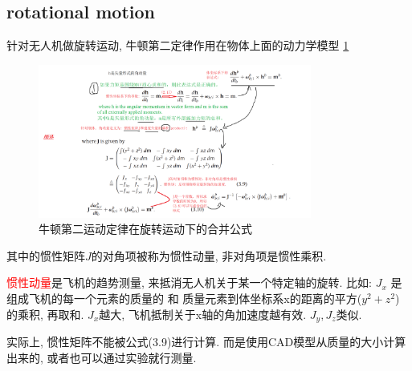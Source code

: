\documentclass[UTF8,a4paper,10pt,nocolorlinks]{ctexart}
\begin{document}
\subsection{rotational motion}
针对无人机做旋转运动, 牛顿第二定律作用在物体上面的动力学模型 \ref{equ_5}
\begin{figure}[htpb]
  \centering
  \includegraphics[width=0.8\textwidth]{picture/equ_5.png}
  \caption{牛顿第二运动定律在旋转运动下的合并公式}
  \label{equ_5}
\end{figure}
其中的惯性矩阵\textbf{$J$}的对角项被称为惯性动量, 非对角项是惯性乘积. \par
\textcolor{red}{惯性动量}是飞机的趋势测量, 来抵消无人机关于某一个特定轴的旋转. 比如: $J_{x}$ 是组成飞机的每一个元素的质量的 和 质量元素到体坐标系x的距离的平方($y^{2} + z^{2}$) 的乘积, 再取和. 
$J_{x}$越大, 飞机抵制关于x轴的角加速度越有效. $J_{y}, J_{z}$类似. \par
实际上, 惯性矩阵不能被公式(3.9)进行计算. 而是使用CAD模型从质量的大小计算出来的, 或者也可以通过实验就行测量. 
\end{document}
